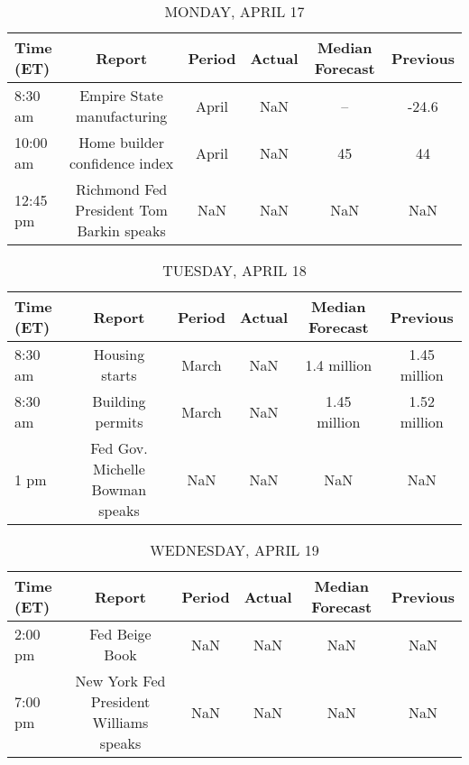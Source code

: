 \documentclass{article}%
\begin{document}
%
\normalsize%


\begin{table}[htbp]%
\caption{MONDAY, APRIL 17}%
\centering%
\begin{adjustbox}{width=1\textwidth}%
\begin{tabular}{lccccc}
\toprule
Time (ET) &                                   Report & Period & Actual & Median Forecast & Previous \\
\midrule
  8:30 am &               Empire State manufacturing &  April &    NaN &              -- &    -24.6 \\
 10:00 am &            Home builder confidence index &  April &    NaN &              45 &       44 \\
 12:45 pm & Richmond Fed President Tom Barkin speaks &    NaN &    NaN &             NaN &      NaN \\
\bottomrule
\end{tabular}
%
\end{adjustbox}%
\end{table}

%


\begin{table}[htbp]%
\caption{TUESDAY, APRIL 18}%
\centering%
\begin{adjustbox}{width=1\textwidth}%
\begin{tabular}{lccccc}
\toprule
Time (ET) &                          Report & Period & Actual & Median Forecast &     Previous \\
\midrule
  8:30 am &                  Housing starts &  March &    NaN &     1.4 million & 1.45 million \\
  8:30 am &                Building permits &  March &    NaN &    1.45 million & 1.52 million \\
     1 pm & Fed Gov. Michelle Bowman speaks &    NaN &    NaN &             NaN &          NaN \\
\bottomrule
\end{tabular}
%
\end{adjustbox}%
\end{table}

%


\begin{table}[htbp]%
\caption{WEDNESDAY, APRIL 19}%
\centering%
\begin{adjustbox}{width=1\textwidth}%
\begin{tabular}{lccccc}
\toprule
Time (ET) &                                 Report & Period & Actual & Median Forecast & Previous \\
\midrule
  2:00 pm &                         Fed Beige Book &    NaN &    NaN &             NaN &      NaN \\
  7:00 pm & New York Fed President Williams speaks &    NaN &    NaN &             NaN &      NaN \\
\bottomrule
\end{tabular}
%
\end{adjustbox}%
\end{table}
\end{document}
